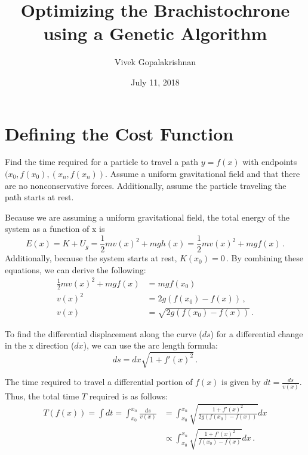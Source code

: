 \documentclass{article}
\title{Optimizing the Brachistochrone using a Genetic Algorithm}
\author{Vivek Gopalakrishnan}
\date{July 11, 2018}
\begin{document}
\maketitle

\section{Defining the Cost Function}
Find the time required for a particle to travel a path $y=f(x)$ with endpoints $(x_0,f(x_0), (x_n, f(x_n))$. Assume a uniform gravitational field and that there are no nonconservative forces. Additionally, assume the particle traveling the path starts at rest.

Because we are assuming a uniform gravitational field, the total energy of the system as a function of x is
\begin{equation}
	E(x) = K + U_g = \frac{1}{2}mv(x)^2 + mgh(x) = \frac{1}{2}mv(x)^2 + mgf(x) \,.
\end{equation}
Additionally, because the system starts at rest, $K(x_0)=0 \,.$
\noindent
By combining these equations, we can derive the following:
\begin{equation}
	\begin{split}
		\frac{1}{2}mv(x)^2 + mgf(x) &= mgf(x_0) \\
		v(x)^2 &= 2g(f(x_0) - f(x)) \,, \\
		v(x) &= \sqrt{2g(f(x_0) - f(x))} \,.
	\end{split}
\end{equation}

\noindent
To find the differential displacement along the curve ($ds$) for a differential change in the x direction ($dx$), we can use the arc length formula:
\begin{equation}
	ds = dx \sqrt{1 + f'(x)^2} \,.
\end{equation}

The time required to travel a differential portion of $f(x)$ is given by $dt = \frac{ds}{v(x)}$. Thus, the total time $T$ required is as follows:
\begin{equation}
	\begin{split}
		T(f(x)) = \int{dt} = \int_{x_0}^{x_n} \frac{ds}{v(x)} &= \int_{x_0}^{x_n} \sqrt{\frac{1 + f'(x)^2}{2g(f(x_0) - f(x))}}dx \\
				        &\propto \int_{x_0}^{x_n} \sqrt{\frac{1 + f'(x)^2}{f(x_0) - f(x)}}dx \,.
	\end{split}
\end{equation}
\end{document}
